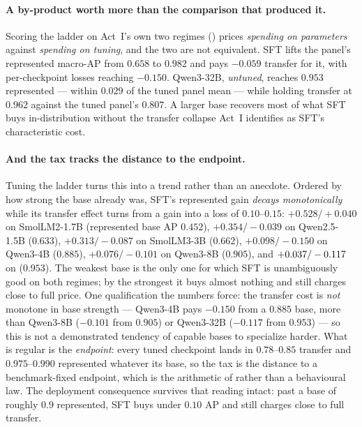 \documentclass[11pt]{article}
\begin{document}
\paragraph{A by-product worth more than the comparison that produced it.} Scoring the ladder
on Act~I's own two regimes () prices \emph{spending on parameters}
against \emph{spending on tuning}, and the two are not equivalent. SFT lifts the panel's
represented macro-AP from $0.658$ to $0.982$ and pays $-0.059$ transfer for it, with
per-checkpoint losses reaching $-0.150$. Qwen3-32B, \emph{untuned}, reaches $0.953$
represented --- within $0.029$ of the tuned panel mean --- while holding transfer at $0.962$
against the tuned panel's $0.807$. A larger base recovers most of what SFT buys
in-distribution without the transfer collapse Act~I identifies as SFT's characteristic cost.

\paragraph{And the tax tracks the distance to the endpoint.} Tuning the ladder turns this into a trend rather
than an anecdote. Ordered by how strong the base already was, SFT's represented gain
\emph{decays monotonically} while its transfer effect turns from a gain into a loss of
$0.10$--$0.15$: $+0.528/{+}0.040$ on
SmolLM2-1.7B (represented base AP $0.452$), $+0.354/-0.039$ on Qwen2.5-1.5B ($0.633$),
$+0.313/-0.087$ on SmolLM3-3B ($0.662$), $+0.098/-0.150$ on Qwen3-4B ($0.885$),
$+0.076/-0.101$ on Qwen3-8B ($0.905$), and
$+0.037/-0.117$ on
\FrontierScaleTunedName{} ($0.953$). The weakest base is the only one for which SFT is
unambiguously good on both regimes; by the strongest it buys almost nothing and still charges
close to full price. One qualification the numbers force: the transfer cost is \emph{not} monotone
in base strength --- Qwen3-4B pays $-0.150$ from a $0.885$ base, more than Qwen3-8B ($-0.101$ from
$0.905$) or Qwen3-32B ($-0.117$ from $0.953$) --- so this is not a demonstrated tendency of capable
bases to specialize harder. What is regular is the \emph{endpoint}: every tuned checkpoint lands in
$0.78$--$0.85$ transfer and $0.975$--$0.990$ represented whatever its base, so the tax is the distance
to a benchmark-fixed endpoint, which is the arithmetic of  rather than a
behavioural law. The deployment consequence survives that reading intact: past a base of roughly
$0.9$ represented, SFT buys under $0.10$ AP and still charges close to full transfer.
\end{document}
